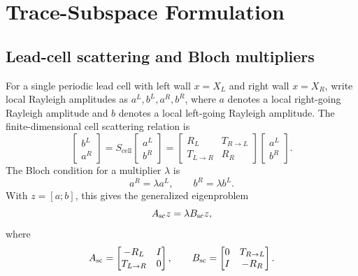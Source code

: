 %
%
%
%
%

\section{Trace-Subspace Formulation}

\subsection{Lead-cell scattering and Bloch multipliers}

For a single periodic lead cell with left wall \(x=X_L\) and right wall
\(x=X_R\), write local Rayleigh amplitudes as \(a^L,b^L,a^R,b^R\), where
\(a\) denotes a local right-going Rayleigh amplitude and \(b\) denotes a local
left-going Rayleigh amplitude.  The finite-dimensional cell scattering relation
is
\[
  \begin{bmatrix}
  b^L\\
  a^R
  \end{bmatrix}
  =
  S_{\mathrm{cell}}
  \begin{bmatrix}
  a^L\\
  b^R
  \end{bmatrix}
  =
  \begin{bmatrix}
  R_L & T_{R\to L}\\
  T_{L\to R} & R_R
  \end{bmatrix}
  \begin{bmatrix}
  a^L\\
  b^R
  \end{bmatrix}.
\]
The Bloch condition for a multiplier \(\lambda\) is
\[
  a^R=\lambda a^L,
  \qquad
  b^R=\lambda b^L .
\]
With \(z=[a;b]\), this gives the generalized eigenproblem
\[
  A_{\mathrm{sc}} z=\lambda B_{\mathrm{sc}} z,
\]
where
\[
  A_{\mathrm{sc}}=
  \begin{bmatrix}
  -R_L&I\\
  T_{L\to R}&0
  \end{bmatrix},
  \qquad
  B_{\mathrm{sc}}=
  \begin{bmatrix}
  0&T_{R\to L}\\
  I&-R_R
  \end{bmatrix}.
\]

